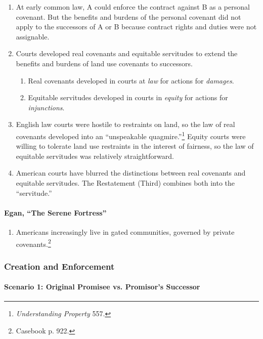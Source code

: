 \begin{enumerate}
    \item At early common law, A could enforce the contract against B as a 
    personal covenant. But the benefits and burdens of the personal covenant 
    did not apply to the successors of A or B because contract rights and 
    duties were not assignable.
    \item Courts developed real covenants and equitable servitudes to extend 
    the benefits and burdens of land use covenants to successors.
    \begin{enumerate}
        \item Real covenants developed in courts at \emph{law} for actions for 
        \emph{damages}.
        \item Equitable servitudes developed in courts in \emph{equity} for 
        actions for \emph{injunctions}.
    \end{enumerate}
    \item English law courts were hostile to restraints on land, so the law of 
    real covenants developed into an ``unspeakable 
    quagmire.''\footnote{\emph{Understanding Property} 557.} Equity courts 
    were willing to tolerate land use restraints in the interest of fairness, 
    so the law of equitable servitudes was relatively straightforward.
    \item American courts have blurred the distinctions between real covenants 
    and equitable servitudes. The Restatement (Third) combines both into the 
    ``servitude.''
\end{enumerate}

\paragraph{Egan, ``The Serene Fortress''}

\begin{enumerate}
    \item Americans increasingly live in gated communities, governed by 
    private covenants.\footnote{Casebook p. 922.}
\end{enumerate}

\subsubsection{Creation and Enforcement}

\paragraph{Scenario 1: Original Promisee vs. Promisor's Successor}

